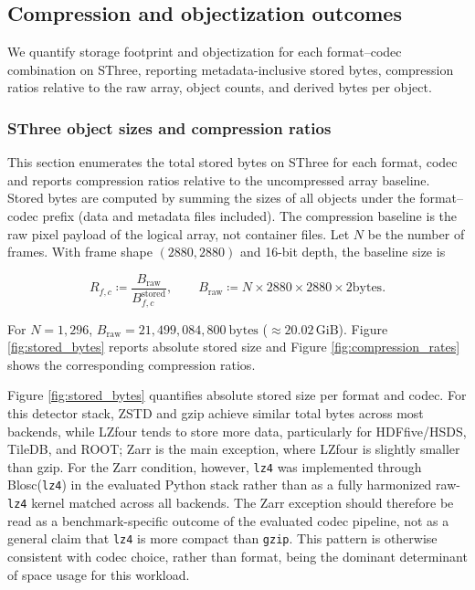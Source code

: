 \documentclass[nomenclature, english, bibtex]{kththesis}
\numberwithin{listing}{chapter}
\begin{document}
\subsection{Compression and objectization outcomes}
We quantify storage footprint and objectization for each format–codec combination on \gls{SThree}, reporting metadata-inclusive stored bytes, compression ratios relative to the raw array, object counts, and derived bytes per object.

\subsubsection{\texorpdfstring{\gls{SThree} object sizes and compression ratios}{S3 object sizes and compression ratios}}
\label{subsec:comp_ratio}
This section enumerates the total stored bytes on \gls{SThree} for each {format, codec} and reports compression ratios relative to the uncompressed array baseline. Stored bytes are computed by summing the sizes of all objects under the format–codec prefix (data and metadata files included). The compression baseline is the raw pixel payload of the logical array, not container files. Let $N$ be the number of frames. With frame shape $(2880,2880)$ and 16-bit depth, the baseline size is

\begin{equation}
\label{eq:compression_ratio}
  R_{f,c} \coloneqq \frac{B_{\text{raw}}}{B^{\text{stored}}_{f,c}},\qquad
  B_{\text{raw}} \coloneqq N \times 2880 \times 2880 \times 2 \text{bytes}.
\end{equation}

For $N=1{,}296$, $B_{\text{raw}}=21{,}499{,}084{,}800\ \text{bytes}$ ($\approx 20.02\,\text{GiB}$). Figure \ref{fig:stored_bytes} reports absolute stored size and Figure \ref{fig:compression_rates} shows the corresponding compression ratios.

Figure \ref{fig:stored_bytes} quantifies absolute stored size per format and codec. For this detector stack, \gls{ZSTD} and gzip achieve similar total bytes across most backends, while \gls{LZfour} tends to store more data, particularly for \gls{HDFfive}/\gls{HSDS}, TileDB, and \gls{ROOT}; Zarr is the main exception, where \gls{LZfour} is slightly smaller than gzip. For the Zarr condition, however, \texttt{lz4} was implemented through Blosc(\texttt{lz4}) in the evaluated Python stack rather than as a fully harmonized raw-\texttt{lz4} kernel matched across all backends. The Zarr exception should therefore be read as a benchmark-specific outcome of the evaluated codec pipeline, not as a general claim that \texttt{lz4} is more compact than \texttt{gzip}. This pattern is otherwise consistent with codec choice, rather than format, being the dominant determinant of space usage for this workload.
\end{document}
